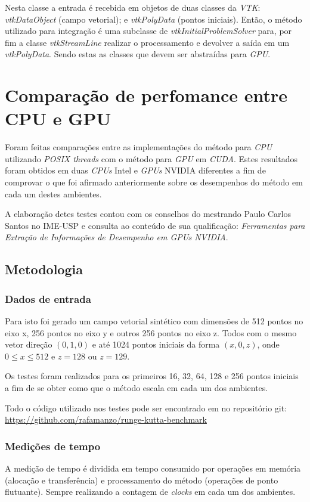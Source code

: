   Nesta classe a entrada é recebida em objetos de duas classes da \textit{VTK}: \textit{vtkDataObject} (campo vetorial); e \textit{vtkPolyData} (pontos iniciais). Então, o método utilizado para integração é uma subclasse de \textit{vtkInitialProblemSolver} para, por fim a classe \textit{vtkStreamLine} realizar o processamento e devolver a saída em um \textit{vtkPolyData}. Sendo estas as classes que devem ser abstraídas para \textit{GPU}.
  
\section{Comparação de perfomance entre CPU e GPU}
Foram feitas comparações entre as implementações do método para \textit{CPU} utilizando \textit{POSIX threads} com o método para \textit{GPU} em \textit{CUDA}. Estes resultados foram obtidos em duas \textit{CPUs} Intel e \textit{GPUs} NVIDIA diferentes a fim de comprovar o que foi afirmado anteriormente sobre os desempenhos do método em cada um destes ambientes.

A elaboração detes testes contou com os conselhos do mestrando Paulo Carlos Santos no IME-USP e consulta ao conteúdo de sua qualificação: \textit{Ferramentas para Extração de Informações de Desempenho em GPUs NVIDIA}.

  \subsection{Metodologia}
    \subsubsection{Dados de entrada}
    Para isto foi gerado um campo vetorial sintético com dimensões de 512 pontos no eixo x, 256 pontos no eixo y e outros 256 pontos no eixo z. Todos com o mesmo vetor direção $(0, 1, 0)$ e até 1024 pontos iniciais da forma $(x, 0, z)$, onde $0 \leq x \leq 512$ e $z = 128$ ou $z = 129$.
    
    Os testes foram realizados para os primeiros 16, 32, 64, 128 e 256 pontos iniciais a fim de se obter como que o método escala em cada um dos ambientes.
    
    Todo o código utilizado nos testes pode ser encontrado em no repositório git: \href{https://github.com/rafamanzo/runge-kutta-benchmark}{https://github.com/rafamanzo/runge-kutta-benchmark}
    
    \subsubsection{Medições de tempo}
    A medição de tempo é dividida em tempo consumido por operações em memória (alocação e transferência) e processamento do método (operações de ponto flutuante). Sempre realizando a contagem de \textit{clocks} em cada um dos ambientes.
    
